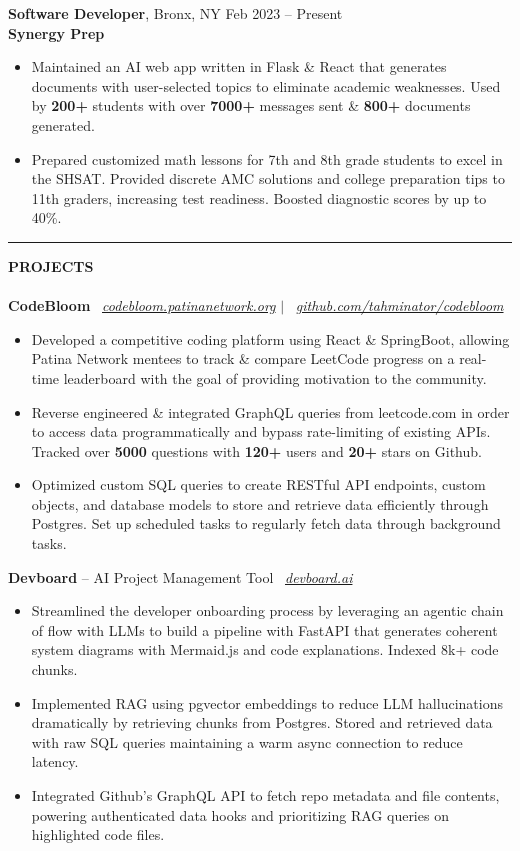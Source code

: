 \documentclass[11pt]{article}
\newcommand{\resumeSection}[1]{%
  \rule{0.04\textwidth}{0.4pt}%
  \textbf{\Large \uppercase{#1}}%
  \hrulefill\\[0.2em]
}
\newenvironment{resumeItemize}{%
  \setlist{nolistsep}
  \begin{itemize}[leftmargin=*, label=\textbullet, itemsep=0.3em]
}{%
  \end{itemize}
}
\newcommand{\resumeSubItem}[1]{\item \small #1}
\newcommand{\githubLink}[2]{{\small \faGithub\ \textit{\href{#1}{#2}}}}
\newcommand{\duplicate}[2]{{\small \faGlobe\ \textit{\href{#1}{#2}}}}
\begin{document}
\medskip

\textbf{\large Software Developer}, Bronx, NY \hfill Feb 2023 -- Present \\ [0.25em]
\textbf{Synergy Prep}
\begin{resumeItemize}
  \resumeSubItem{Maintained an AI web app written in Flask \& React that generates documents with user-selected
    topics to eliminate academic weaknesses. Used by \textbf{200+} students with over \textbf{7000+} messages sent \& \textbf{800+} documents generated.}
  \resumeSubItem{Prepared customized math lessons for 7th and 8th grade students to excel in the SHSAT. Provided
    discrete AMC solutions and college preparation tips to 11th graders, increasing test readiness. Boosted diagnostic scores by up to 40\%.}
\end{resumeItemize}

\medskip

\bigskip
\resumeSection{Projects}
\\[-0.7em]
\textbf{\large CodeBloom} \hfill \duplicate{https://codebloom.patinanetwork.org}{codebloom.patinanetwork.org} $|$ \githubLink{https://github.com/tahminator/codebloom}{github.com/tahminator/codebloom}
\begin{resumeItemize}
  \resumeSubItem{Developed a competitive coding platform using React \& SpringBoot, allowing Patina Network mentees to track \& compare LeetCode progress on a real-time leaderboard with the goal of providing motivation to the community.}
  \resumeSubItem{Reverse engineered \& integrated GraphQL queries from leetcode.com in order to access data programmatically and bypass rate-limiting of existing APIs. Tracked over \textbf{5000} questions with \textbf{120+} users and \textbf{20+} stars on Github.}
  \resumeSubItem{Optimized custom SQL queries to create RESTful API endpoints, custom objects, and database models to store and retrieve data efficiently through Postgres. Set up scheduled tasks to regularly fetch data through background tasks.}
\end{resumeItemize}

\medskip

\textbf{\large Devboard} \footnotesize{-- AI Project Management Tool} \hfill \duplicate{https://devboard.ai}{devboard.ai}
\begin{resumeItemize}
  \resumeSubItem{Streamlined the developer onboarding process by leveraging an agentic chain of flow with LLMs to build a pipeline with FastAPI that generates coherent system diagrams with Mermaid.js and code explanations. Indexed 8k+ code chunks.}
  \resumeSubItem{Implemented RAG using pgvector embeddings to reduce LLM hallucinations dramatically by retrieving chunks from Postgres. Stored and retrieved data with raw SQL queries maintaining a warm async connection to reduce latency.}
  \resumeSubItem{Integrated Github’s GraphQL API to fetch repo metadata and file contents, powering authenticated data hooks and prioritizing RAG queries on highlighted code files.}
\end{resumeItemize}
\end{document}
